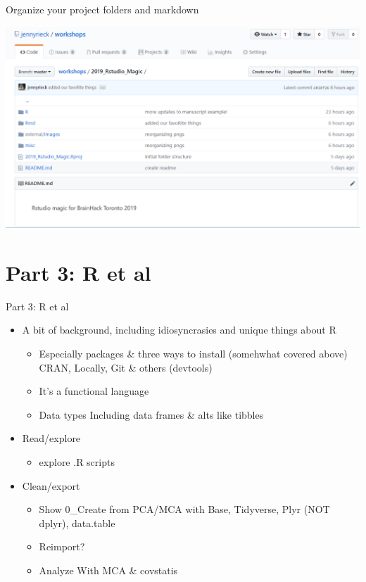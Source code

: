 \documentclass[ignorenonframetext,]{beamer}
\providecommand{\tightlist}{%
  \setlength{\itemsep}{0pt}\setlength{\parskip}{0pt}}
\begin{document}
\begin{frame}{Organize your project folders and markdown}
\protect\hypertarget{organize-your-project-folders-and-markdown-1}{}

\includegraphics{../external/images/setup_5_git.PNG}

\end{frame}

\hypertarget{part-3-r-et-al}{%
\section{Part 3: R et al}\label{part-3-r-et-al}}

\begin{frame}{Part 3: R et al}
\protect\hypertarget{part-3-r-et-al-1}{}

\begin{itemize}
\tightlist
\item
  A bit of background, including idiosyncrasies and unique things about
  R

  \begin{itemize}
  \tightlist
  \item
    Especially packages \& three ways to install (somehwhat covered
    above) CRAN, Locally, Git \& others (devtools)
  \item
    It's a functional language
  \item
    Data types Including data frames \& alts like tibbles
  \end{itemize}
\item
  Read/explore

  \begin{itemize}
  \tightlist
  \item
    explore .R scripts
  \end{itemize}
\item
  Clean/export

  \begin{itemize}
  \tightlist
  \item
    Show 0\_Create from PCA/MCA with Base, Tidyverse, Plyr (NOT dplyr),
    data.table
  \item
    Reimport?
  \item
    Analyze With MCA \& covstatis
  \end{itemize}
\end{itemize}

\end{frame}
\end{document}
